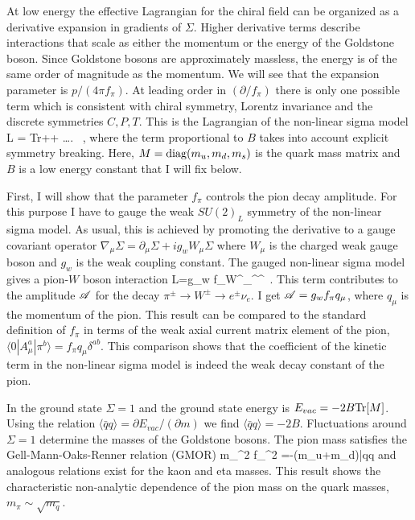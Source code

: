  At low energy the effective Lagrangian for the chiral field can be 
organized as a derivative expansion in gradients of $\Sigma$. Higher 
derivative terms describe interactions that scale as either the 
momentum or the energy of the Goldstone boson. Since Goldstone bosons 
are approximately massless, the energy is of the same order of magnitude 
as the momentum. We will see that the expansion parameter is $p/(4\pi 
f_\pi)$. At leading order in $(\partial/f_\pi)$ there is only one 
possible term which is consistent with chiral symmetry, Lorentz invariance 
and the discrete symmetries $C,P,T$. This is the Lagrangian of the 
non-linear sigma model
\be
\label{l_chpt}
{\mathcal L} =  {\rm Tr}\left[
 \partial_\mu\Sigma\partial^\mu\Sigma^\dagger\right] 
  +
+ \ldots. \, , 
\ee
where the term proportional to $B$ takes into account explicit symmetry 
breaking. Here, $M={\rm diag}(m_u,m_d,m_s)$ is the quark mass matrix 
and $B$ is a low energy constant that I will fix below. 

 First, I will show that the parameter $f_\pi$ controls the pion decay 
amplitude. For this purpose I have to gauge the weak $SU(2)_L$ symmetry
of the non-linear sigma model. 
As usual, this is achieved by promoting the derivative to a gauge covariant 
operator $\nabla_\mu\Sigma = \partial_\mu\Sigma+ig_w W_\mu\Sigma$ where 
$W_\mu$ is the charged weak gauge boson and $g_w$ is the weak coupling 
constant. The gauged non-linear sigma model gives a pion-$W$ boson 
interaction 
\be 
{\mathcal L}=g_w f_\pi W^\pm_\mu \partial^\mu \pi^\mp\, .
\ee 
This term contributes to the amplitude ${\cal A}$ for the decay $\pi^\pm\to 
W^\pm\to e^\pm\nu_e$. I get ${\cal A}=g_wf_\pi q_\mu$, where $q_\mu$ is 
the momentum of the pion. This result can be compared to the standard
definition of $f_\pi$ in terms of the weak axial current matrix element 
of the pion, $\langle 0|A_\mu^a|\pi^b\rangle = f_\pi q_\mu\delta^{ab}$. 
This comparison shows that the coefficient of the kinetic term in the
non-linear sigma model is indeed the weak decay constant of the pion.

 In the ground state $\Sigma=1$ and the ground state energy is $E_{vac}=
-2B{\rm Tr}[M]$. Using the relation $\langle\bar{q}q\rangle = \partial 
E_{vac}/(\partial m)$ we find $\langle\bar{q}q\rangle=-2B$. Fluctuations 
around $\Sigma=1$ determine the masses of the Goldstone bosons. The 
pion mass satisfies the Gell-Mann-Oaks-Renner relation (GMOR) 
\cite{GellMann:1968rz}
\be
\label{GMOR}
m_\pi^2 f_\pi^2 =-(m_u+m_d)\langle\bar{q}q\rangle
\ee
and analogous relations exist for the kaon and eta masses. This result
shows the characteristic non-analytic dependence of the pion mass on
the quark masses, $m_\pi\sim \sqrt{m_q}$. 


